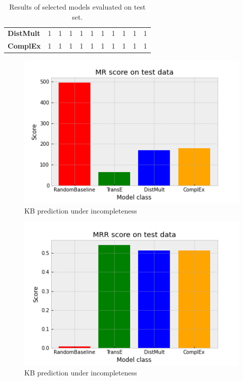 \begin{table}[]
\begin{tabular}{|l||ccccc||ccccc|}
\textbf{DistMult}                      & 1                                                 & 1                                                  & 1                      & 1                      & 1                       & 1                                                 & 1                                                  & 1                      & 1                      & 1                       \\ 
\textbf{ComplEx}                       & 1                                                 & 1                                                  & 1                      & 1                      & 1                       & 1                                                 & 1                                                  & 1                      & 1                      & 1                       \\ \hline
\end{tabular}
\caption{Results of selected models evaluated on test set.}
\end{table}

\begin{figure}[htp]
    \centering
    \includegraphics[width=12cm]{figures/model_selection/family_scores_1.png}
    \caption{KB prediction under incompleteness}
\end{figure}


\begin{figure}[htp]
    \centering
    \includegraphics[width=12cm]{figures/model_selection/family_scores_0.png}
    \caption{KB prediction under incompleteness}
\end{figure}


